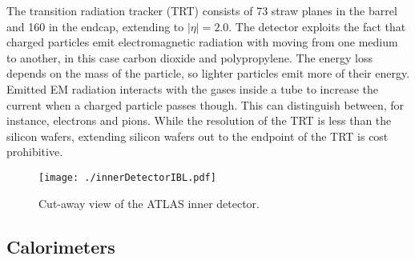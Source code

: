 The transition radiation tracker (TRT) consists of 73 straw planes in the barrel and 160 in the endcap, extending to $|\eta|=2.0$.  The detector exploits the fact that charged particles emit electromagnetic radiation with moving from one medium to another, in this case carbon dioxide and polypropylene.  The energy loss depends on the mass of the particle, so lighter particles emit more of their energy.  Emitted EM radiation interacts with the gases inside a tube to increase the current when a charged particle passes though.  This can distinguish between, for instance, electrons and pions.  While the resolution of the TRT is less than the silicon wafers, extending silicon wafers out to the endpoint of the TRT is cost prohibitive.  \\

\begin{figure}[h!]
  \centering
	\texttt{[image: ./innerDetectorIBL.pdf]}
\caption{\label{fig:innerDetector}{ Cut-away view of the ATLAS inner detector\cite{IBL}. }} %
\end{figure}

\subsection{Calorimeters}  \label{sec:calorimeters}%

